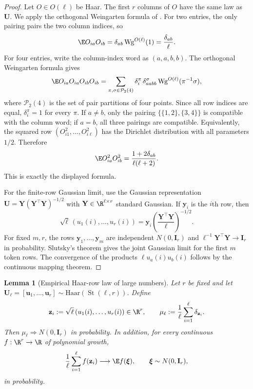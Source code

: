 \documentclass{article}
\newcommand{\St}{\operatorname{St}}
\newcommand{\weak}{\Rightarrow}
\newcommand{\bU}{\mathbf{U}}
\newcommand{\bu}{\mathbf{u}}
\newtheorem{lemma}[theorem]{Lemma}
\theoremstyle{definition}
\theoremstyle{remark}
\begin{document}
\begin{proof}
Let $O\in O(\ell)$ be Haar.  The first $r$ columns of $O$ have the same law as
$\bU$.  We apply the orthogonal Weingarten formula of
\citet{collins:2006integration}.  For two entries, the only pairing pairs the
two column indices, so
\[
    \E O_{ia}O_{ib}
    =
    \delta_{ab}\,\mathrm{Wg}^{O(\ell)}(1)
    =
    \frac{\delta_{ab}}{\ell}.
\]
For four entries, write the column-index word as $(a,a,b,b)$.  The orthogonal
Weingarten formula gives
\[
    \E O_{ia}O_{ia}O_{ib}O_{ib}
    =
    \sum_{\pi,\sigma\in\mathcal P_2(4)}
    \delta_i^\pi\,\delta_{aabb}^{\sigma}\,
    \mathrm{Wg}^{O(\ell)}(\pi^{-1}\sigma),
\]
where $\mathcal P_2(4)$ is the set of pair partitions of four points.  Since all
row indices are equal, $\delta_i^\pi=1$ for every $\pi$.  If $a\neq b$, only
the pairing $\{\{1,2\},\{3,4\}\}$ is compatible with the column word; if $a=b$,
all three pairings are compatible.  Equivalently, the squared row
$(O_{i1}^2,\ldots,O_{i\ell}^2)$ has the Dirichlet distribution with all
parameters $1/2$.  Therefore
\[
    \E O_{ia}^2O_{ib}^2
    =
    \frac{1+2\delta_{ab}}{\ell(\ell+2)}.
\]
This is exactly the displayed formula.

For the finite-row Gaussian limit, use the Gaussian representation
$\bU=\mathbf Y(\mathbf Y^\top\mathbf Y)^{-1/2}$ with
$\mathbf Y\in\R^{\ell\times r}$ standard Gaussian.  If $\mathbf y_i$ is the $i$th row,
then
\[
    \sqrt\ell\,(u_1(i),\ldots,u_r(i))
    =
    \mathbf y_i
    \left(\frac{\mathbf Y^\top\mathbf Y}{\ell}\right)^{-1/2}.
\]
For fixed $m,r$, the rows $\mathbf y_1,\ldots,\mathbf y_m$ are independent
$N(0,\mathbf I_r)$ and $\ell^{-1}\mathbf Y^\top\mathbf Y\to\mathbf I_r$ in probability.
Slutsky's theorem gives the joint Gaussian limit for the first $m$ token rows.
The convergence of the products
$\ell u_a(i)u_b(i)$ follows by the continuous mapping theorem.
\end{proof}

\begin{lemma}[Empirical Haar-row law of large numbers]
Let $r$ be fixed and let
$\bU_\ell=[\bu_1,\ldots,\bu_r]\sim\mathrm{Haar}(\St(\ell,r))$.  Define
\[
    \mathbf z_i
    :=
    \sqrt\ell\,(u_1(i),\ldots,u_r(i))\in\R^r,
    \qquad
    \mu_\ell
    :=
    \frac1\ell\sum_{i=1}^{\ell}\delta_{\mathbf z_i}.
\]
Then $\mu_\ell\weak N(0,\mathbf I_r)$ in probability.  In addition, for every
continuous $f:\R^r\to\R$ of polynomial growth,
\[
    \frac1\ell\sum_{i=1}^{\ell}f(\mathbf z_i)
    \longrightarrow
    \E f(\boldsymbol{\xi}),
    \qquad
    \boldsymbol{\xi}\sim N(0,\mathbf I_r),
\]
in probability.
\label{lem:empirical-haar-row}
\end{lemma}
\end{document}
